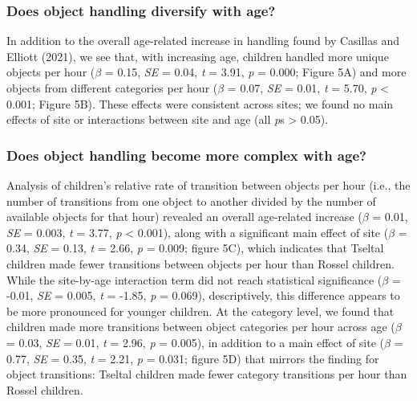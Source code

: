 \documentclass[10pt, letterpaper]{article}
\begin{document}
\hypertarget{does-object-handling-diversify-with-age}{%
\subsubsection{Does object handling diversify with
age?}\label{does-object-handling-diversify-with-age}}

In addition to the overall age-related increase in handling found by
Casillas and Elliott (2021), we see that, with increasing age, children
handled more unique objects per hour (\(\beta\) = 0.15, \emph{SE} =
0.04, \emph{t} = 3.91, \emph{p} = 0.000; Figure 5A) and more objects
from different categories per hour (\(\beta\) = 0.07, \emph{SE} = 0.01,
\emph{t} = 5.70, \emph{p} \textless{} 0.001; Figure 5B). These effects
were consistent across sites; we found no main effects of site or
interactions between site and age (all \emph{p}s \textgreater{}
0.05).\newline

\hypertarget{does-object-handling-become-more-complex-with-age}{%
\subsubsection{Does object handling become more complex with
age?}\label{does-object-handling-become-more-complex-with-age}}

Analysis of children's relative rate of transition between objects per
hour (i.e., the number of transitions from one object to another divided
by the number of available objects for that hour) revealed an overall
age-related increase (\(\beta\) = 0.01, \emph{SE} = 0.003, \emph{t} =
3.77, \emph{p} \textless{} 0.001), along with a significant main effect
of site (\(\beta\) = 0.34, \emph{SE} = 0.13, \emph{t} = 2.66, \emph{p} =
0.009; figure 5C), which indicates that Tseltal children made fewer
transitions between objects per hour than Rossel children. While the
site-by-age interaction term did not reach statistical significance
(\(\beta\) = -0.01, \emph{SE} = 0.005, \emph{t} = -1.85, \emph{p} =
0.069), descriptively, this difference appears to be more pronounced for
younger children. At the category level, we found that children made
more transitions between object categories per hour across age
(\(\beta\) = 0.03, \emph{SE} = 0.01, \emph{t} = 2.96, \emph{p} = 0.005),
in addition to a main effect of site (\(\beta\) = 0.77, \emph{SE} =
0.35, \emph{t} = 2.21, \emph{p} = 0.031; figure 5D) that mirrors the
finding for object transitions: Tseltal children made fewer category
transitions per hour than Rossel children.
\end{document}
